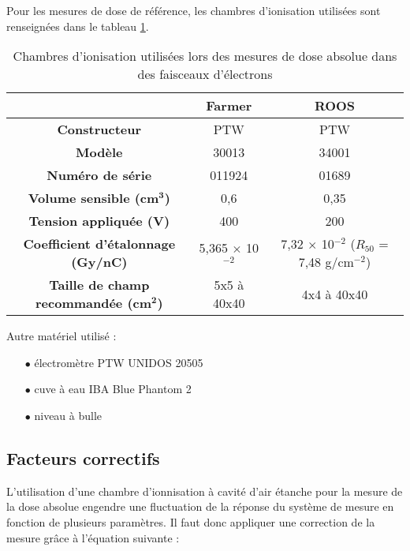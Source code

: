 \documentclass{article}
\begin{document}
Pour les mesures de dose de référence, les chambres d'ionisation utilisées sont renseignées dans le tableau \ref*{table_matos_chambres}.

\begin{table}[h]
  \centering
  \begin{tabular}{c|c|c|}
  \cline{2-3}
  \textbf{} & \textbf{Farmer} & \textbf{ROOS} \\ \hline
  \multicolumn{1}{|c|}{\textbf{Constructeur}} & PTW & PTW \\
  \multicolumn{1}{|c|}{\textbf{Modèle}} & 30013 & 34001 \\
  \multicolumn{1}{|c|}{\textbf{Numéro de série}} & 011924 & 01689 \\
  \multicolumn{1}{|c|}{\textbf{Volume sensible (cm}$\mathbf{^3}$\textbf{)}} & 0,6 & 0,35 \\
  \multicolumn{1}{|c|}{\textbf{Tension appliquée (V)}} & 400 & 200 \\
  \multicolumn{1}{|c|}{\textbf{Coefficient d'étalonnage (Gy/nC)}} & 5,365 $\times$ 10$^{-2}$ & 7,32 $\times$ 10$^{-2}$ ($R_{50}$ = 7,48 g/cm$^{-2}$)\\
  \multicolumn{1}{|c|}{\textbf{Taille de champ recommandée (cm}$\mathbf{^2}$\textbf{)}} & 5x5 à 40x40 & 4x4 à 40x40 \\ \hline
  \end{tabular}
  \caption{Chambres d'ionisation utilisées lors des mesures de dose absolue dans des faisceaux d'électrons}
  \label{table_matos_chambres}
\end{table}

Autre matériel utilisé :

\begin{itemize}
  \item[$\bullet$] électromètre PTW UNIDOS 20505
  \item[$\bullet$] cuve à eau IBA Blue Phantom 2
  \item[$\bullet$] niveau à bulle
\end{itemize}

\subsection{Facteurs correctifs}

L'utilisation d'une chambre d'ionnisation à cavité d'air étanche pour la mesure de la dose absolue engendre une fluctuation de la réponse du système de mesure en fonction de plusieurs paramètres. Il faut donc appliquer une correction de la mesure grâce à l'équation suivante :
\end{document}
